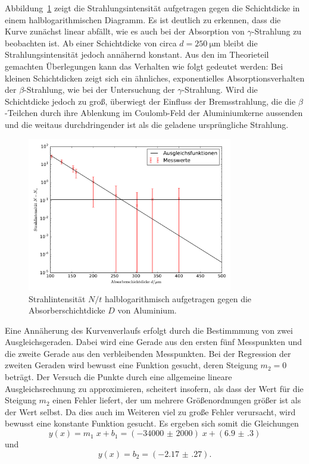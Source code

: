 \documentclass[
  bibliography=totoc,     %
  captions=tableheading,  %
  titlepage=firstiscover, %
]{scrartcl}
\begin{document}
Abbildung~\ref{fig:plot_aluminium} zeigt die Strahlungsintensität
aufgetragen gegen die Schichtdicke in einem halblogarithmischen Diagramm. Es ist
deutlich zu erkennen, dass die Kurve zunächst linear abfällt, wie es auch bei
der Absorption von $\gamma$-Strahlung zu beobachten ist. Ab einer Schichtdicke
von circa $d=\SI{250}{\micro\metre}$ bleibt die Strahlungsintensität jedoch
annähernd konstant. Aus den im Theorieteil gemachten Überlegungen kann das
Verhalten wie folgt gedeutet werden: Bei kleinen Schichtdicken zeigt sich ein
ähnliches, exponentielles Absorptionsverhalten der $\beta$-Strahlung, wie bei
der Untersuchung der $\gamma$-Strahlung. Wird die Schichtdicke jedoch zu groß,
überwiegt der Einfluss der Bremsstrahlung, die die $\beta$-Teilchen durch ihre
Ablenkung im Coulomb-Feld der Aluminiumkerne aussenden und die weitaus
durchdringender ist als die geladene ursprüngliche Strahlung.

\begin{figure}[ht]
    \centering
    \includegraphics[width=0.80\textwidth]{plot_Aluminium.pdf}
    \caption{Strahlintensität $N/t$ halblogarithmisch aufgetragen gegen die Absorberschichtdicke $D$ von Aluminium.}
    \label{fig:plot_aluminium}
\end{figure}

Eine Annäherung des Kurvenverlaufs erfolgt durch die Bestimmmung von zwei
Ausgleichsgeraden. Dabei wird eine Gerade aus den ersten fünf Messpunkten und
die zweite Gerade aus den verbleibenden Messpunkten. Bei der Regression der
zweiten Geraden wird bewusst eine Funktion gesucht, deren Steigung $m_2=0$
beträgt. Der Versuch die Punkte durch eine allgemeine lineare Ausgleichsrechnung
zu approximieren, scheitert insofern, als dass der Wert für die Steigung $m_2$
einen Fehler liefert, der um mehrere Größenordnungen größer ist als der Wert
selbst. Da dies auch im Weiteren viel zu große Fehler verursacht, wird bewusst
eine konstante Funktion gesucht. Es ergeben sich somit die Gleichungen
%
\begin{equation}
    y(x) = m_1\;x+b_1 = (\num{-34000(2000)})\;x+(\num{6.9(3)})
    \label{eq:geradengleichung_aluminium_1}
\end{equation}
%
und
%
\begin{equation}
    y(x) = b_2 = (\num{-2.17(27)}).
    \label{eq:geradengleichung_aluminium_2}
\end{equation}
\end{document}
